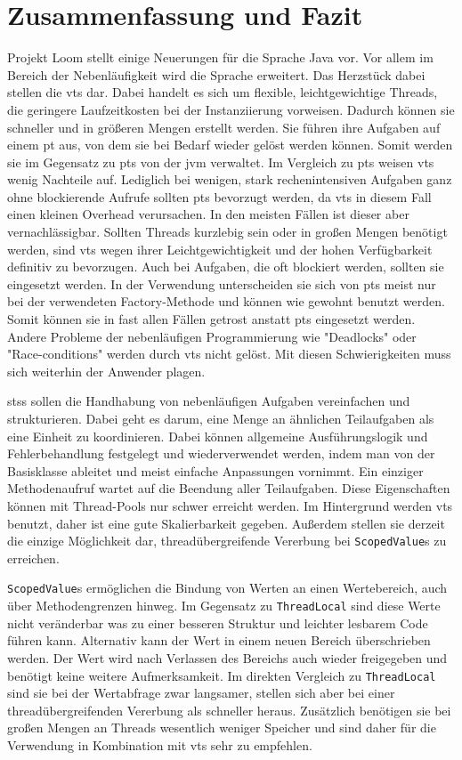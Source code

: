 \chapter{Zusammenfassung und Fazit}
\label{cha:fazit}
    Projekt Loom stellt einige Neuerungen für die Sprache Java vor. Vor allem im Bereich der Nebenläufigkeit wird die Sprache erweitert. Das Herzstück dabei stellen die \Glspl{vt} dar.
    Dabei handelt es sich um flexible, leichtgewichtige Threads, die geringere Laufzeitkosten bei der Instanziierung vorweisen. Dadurch können sie schneller und in größeren Mengen erstellt werden.
    Sie führen ihre Aufgaben auf einem \gls{pt} aus, von dem sie bei Bedarf wieder gelöst werden können. Somit werden sie im Gegensatz zu \Glspl{pt} von der \gls{jvm} verwaltet.
    Im Vergleich zu \Glspl{pt} weisen \Glspl{vt} wenig Nachteile auf. Lediglich bei wenigen, stark rechenintensiven Aufgaben ganz ohne blockierende Aufrufe sollten \Glspl{pt} bevorzugt werden, da \Glspl{vt}
    in diesem Fall einen kleinen Overhead verursachen. In den meisten Fällen ist dieser aber vernachlässigbar. Sollten Threads kurzlebig sein oder in großen Mengen benötigt werden, sind \Glspl{vt}
    wegen ihrer Leichtgewichtigkeit und der hohen Verfügbarkeit definitiv
    zu bevorzugen. Auch bei Aufgaben, die oft blockiert werden, sollten sie eingesetzt werden. In der Verwendung unterscheiden sie sich von \Glspl{pt} 
    meist nur bei der verwendeten Factory-Methode und können wie gewohnt benutzt werden.
    Somit können sie in fast allen Fällen getrost anstatt \Glspl{pt} eingesetzt werden. Andere Probleme der nebenläufigen Programmierung wie "Deadlocks" oder "Race-conditions" werden durch \Glspl{vt} nicht gelöst.
    Mit diesen Schwierigkeiten muss sich weiterhin der Anwender plagen.

    \Glspl{sts} sollen die Handhabung von nebenläufigen Aufgaben vereinfachen und strukturieren. Dabei geht es darum, eine Menge an ähnlichen Teilaufgaben als eine Einheit zu koordinieren. Dabei können allgemeine
    Ausführungslogik und Fehlerbehandlung festgelegt und wiederverwendet werden, indem man von der Basisklasse ableitet und meist einfache Anpassungen vornimmt. Ein einziger Methodenaufruf wartet auf
    die Beendung aller Teilaufgaben.
    Diese Eigenschaften können mit Thread-Pools nur
    schwer erreicht werden. Im Hintergrund werden \Glspl{vt} benutzt,
    daher ist eine gute Skalierbarkeit gegeben. Außerdem stellen sie derzeit die einzige Möglichkeit dar, threadübergreifende Vererbung bei \texttt{ScopedValue}s zu erreichen.

    \texttt{ScopedValue}s ermöglichen die Bindung von Werten an einen Wertebereich, auch über Methodengrenzen hinweg. Im Gegensatz zu \texttt{ThreadLocal} sind diese Werte nicht veränderbar was zu einer 
    besseren Struktur und leichter lesbarem Code führen kann. Alternativ kann der Wert in einem neuen Bereich überschrieben werden. Der Wert wird nach Verlassen des Bereichs auch wieder freigegeben und
    benötigt keine weitere Aufmerksamkeit. Im direkten Vergleich zu \texttt{ThreadLocal} sind sie bei der Wertabfrage zwar langsamer, stellen sich aber bei einer threadübergreifenden Vererbung als schneller heraus.
    Zusätzlich benötigen sie bei großen Mengen an Threads wesentlich weniger Speicher und sind daher für die Verwendung in Kombination mit \Glspl{vt} sehr zu empfehlen. 